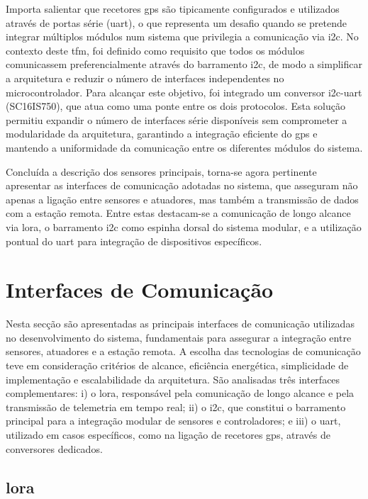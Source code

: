 Importa salientar que recetores \gls{gps} são tipicamente configurados e utilizados através de portas série (\gls{uart}), o que representa um desafio quando se pretende integrar múltiplos módulos num sistema que privilegia a comunicação via \gls{i2c}. No contexto deste \gls{tfm}, foi definido como requisito que todos os módulos comunicassem preferencialmente através do barramento \gls{i2c}, de modo a simplificar a arquitetura e reduzir o número de interfaces independentes no microcontrolador. Para alcançar este objetivo, foi integrado um conversor \gls{i2c}-\gls{uart} (SC16IS750), que atua como uma ponte entre os dois protocolos. Esta solução permitiu expandir o número de interfaces série disponíveis sem comprometer a modularidade da arquitetura, garantindo a integração eficiente do \gls{gps} e mantendo a uniformidade da comunicação entre os diferentes módulos do sistema.  

Concluída a descrição dos sensores principais, torna-se agora pertinente apresentar as interfaces de comunicação adotadas no sistema, que asseguram não apenas a ligação entre sensores e atuadores, mas também a transmissão de dados com a estação remota. Entre estas destacam-se a comunicação de longo alcance via \gls{lora}, o barramento \gls{i2c} como espinha dorsal do sistema modular, e a utilização pontual do \gls{uart} para integração de dispositivos específicos.

\section{Interfaces de Comunicação}

Nesta secção são apresentadas as principais interfaces de comunicação utilizadas no desenvolvimento do sistema, fundamentais para assegurar a integração entre sensores, atuadores e a estação remota. A escolha das tecnologias de comunicação teve em consideração critérios de alcance, eficiência energética, simplicidade de implementação e escalabilidade da arquitetura. São analisadas três interfaces complementares: i) o \gls{lora}, responsável pela comunicação de longo alcance e pela transmissão de telemetria em tempo real; ii) o \gls{i2c}, que constitui o barramento principal para a integração modular de sensores e controladores; e iii) o \gls{uart}, utilizado em casos específicos, como na ligação de recetores \gls{gps}, através de conversores dedicados.  

\subsection{\acrfull{lora}}

